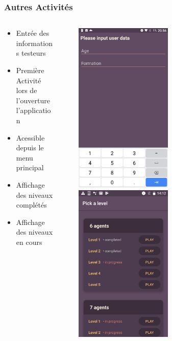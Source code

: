 \documentclass{beamer}
\begin{document}
\begin{frame}
\frametitle{Autres Activités}
\begin{columns}
\begin{column}{0.49\textwidth}
   \begin{itemize}
	\item Entrée des informations testeurs 
    \item Première Activité lors de l'ouverture l'application  
    \item Acessible depuis le menu principal
    \item Affichage des niveaux complétés
    \item Affichage des niveaux en cours
\end{itemize}
\end{column}~
\begin{column}{0.49\textwidth}
    \begin{center}
     \includegraphics[width=0.49\textwidth]{infor}
     ~
     \includegraphics[width=0.49\textwidth]{levelmenu}   
     \end{center}
\end{column}
\end{columns}
\end{frame}
\end{document}
